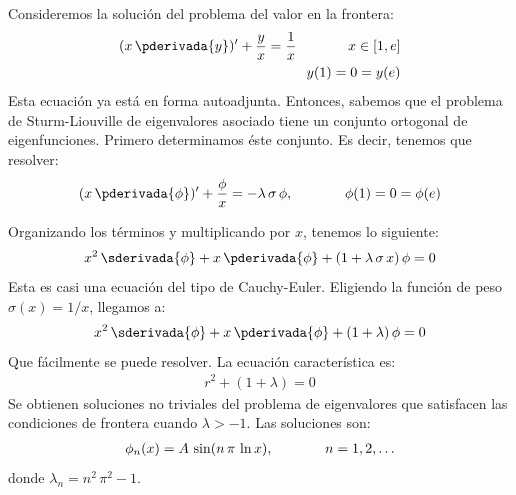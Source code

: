 \begin{ejemplo}
Consideremos la solución del problema del valor en la frontera:
\begin{align}
(x \, \pderivada{y})^{\prime} + \dfrac{y}{x} = \dfrac{1}{x} \hspace{1.3cm} x \in [1, e] \label{eq:ecuacion_04_24} \\
y (1) = 0 = y (e) \label{eq:ecuacion_04_25}
\end{align}
Esta ecuación ya está en forma autoadjunta. Entonces, sabemos que el problema de Sturm-Liouville de eigenvalores asociado tiene un conjunto ortogonal de eigenfunciones. Primero determinamos éste conjunto. Es decir, tenemos que resolver:
\begin{align}
(x \, \pderivada{\phi})^{\prime} + \dfrac{\phi}{x} = -\lambda \, \sigma \, \phi, \hspace{1.3cm} \phi (1) = 0 =\phi (e)
\label{eq:ecuacion_04_26}
\end{align}

Organizando los términos y multiplicando por $x$, tenemos lo siguiente:
\begin{align*}
x^{2} \, \sderivada{\phi} + x \, \pderivada{\phi} + (1 + \lambda \, \sigma \, x) \, \phi = 0
\end{align*}
Esta es casi una ecuación del tipo de Cauchy-Euler. Eligiendo la función de peso $\sigma (x) = 1 / x$, llegamos a:
\begin{align*}
x^{2} \, \sderivada{\phi} + x \, \pderivada{\phi} + (1 + \lambda ) \, \phi = 0
\end{align*}
Que fácilmente se puede resolver. La ecuación característica es:
\begin{align*}
r^{2} + (1 + \lambda) = 0
\end{align*}
Se obtienen soluciones no triviales del problema de eigenvalores que satisfacen las condiciones de frontera cuando $\lambda > -1$. Las soluciones son:
\begin{align*}
\phi_{n} (x) = A \, \sin (n \, \pi \, \ln x), \hspace{1.3cm} n = 1, 2, \ldots
\end{align*}
donde $\lambda_{n} = n^{2} \, \pi^{2} - 1$.


\end{ejemplo}
